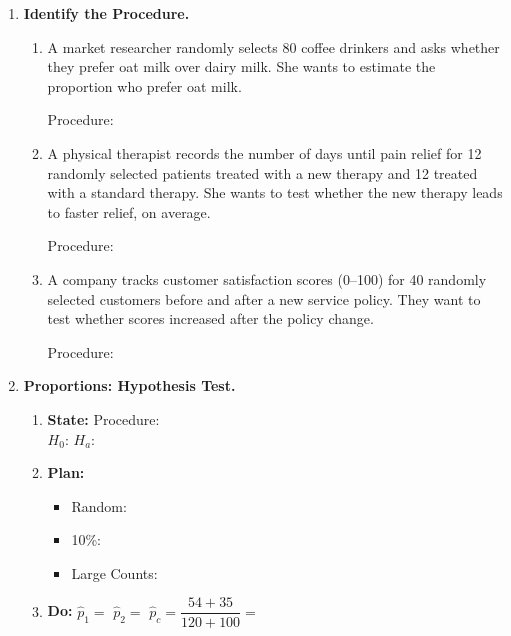 \documentclass[10pt]{article}
\begin{document}
\namedateperiod

\vspace{0.12in}

\begin{enumerate}

\item \textbf{Identify the Procedure.}

\begin{enumerate}[label=\alph*.]
  \item A market researcher randomly selects 80 coffee drinkers and asks whether they prefer
        oat milk over dairy milk. She wants to estimate the proportion who prefer oat milk.

        Procedure: 

  \item A physical therapist records the number of days until pain relief for 12 randomly
        selected patients treated with a new therapy and 12 treated with a standard therapy.
        She wants to test whether the new therapy leads to faster relief, on average.

        Procedure: 

  \item A company tracks customer satisfaction scores (0--100) for 40 randomly selected
        customers before and after a new service policy. They want to test whether scores
        increased after the policy change.

        Procedure: 
\end{enumerate}

\vspace{0.10in}

\item \textbf{Proportions: Hypothesis Test.}

      \begin{enumerate}[label=\alph*.]
        \item \textbf{State:} Procedure: \\
              $H_0$:  \quad $H_a$: 
        \item \textbf{Plan:}
              \begin{itemize}
                \item Random: 
                \item 10\%: 
                \item Large Counts: 
              \end{itemize}
        \item \textbf{Do:} $\hat p_1 =$  \; $\hat p_2 =$  \;
              $\hat p_c = \dfrac{54+35}{120+100} =$ 


\end{enumerate}
\end{enumerate}
\end{document}
